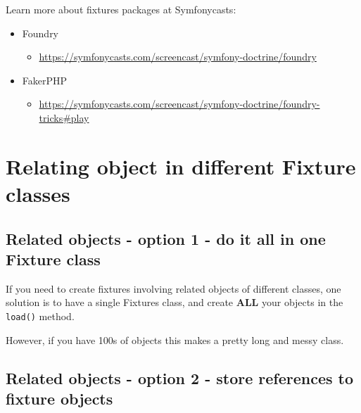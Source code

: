 \documentclass[a4paperpaper,openright]{book}
\providecommand{\tightlist}{%
  \setlength{\itemsep}{0pt}\setlength{\parskip}{0pt}}
\begin{document}
Learn more about fixtures packages at Symfonycasts:

\begin{itemize}
\item
  Foundry

  \begin{itemize}
  \tightlist
  \item
    \url{https://symfonycasts.com/screencast/symfony-doctrine/foundry}
  \end{itemize}
\item
  FakerPHP

  \begin{itemize}
  \tightlist
  \item
    \url{https://symfonycasts.com/screencast/symfony-doctrine/foundry-tricks\#play}
  \end{itemize}
\end{itemize}

\hypertarget{relating-object-in-different-fixture-classes}{%
\chapter{\texorpdfstring{Relating object in different Fixture
classes\label{chapter_related_fixtures}}{Relating object in different Fixture classes}}\label{relating-object-in-different-fixture-classes}}

\hypertarget{related-objects---option-1---do-it-all-in-one-fixture-class}{%
\section{Related objects - option 1 - do it all in one Fixture
class}\label{related-objects---option-1---do-it-all-in-one-fixture-class}}

If you need to create fixtures involving related objects of different
classes, one solution is to have a single Fixtures class, and create
\textbf{ALL} your objects in the \texttt{load()} method.

However, if you have 100s of objects this makes a pretty long and messy
class.

\hypertarget{related-objects---option-2---store-references-to-fixture-objects}{%
\section{Related objects - option 2 - store references to fixture
objects}\label{related-objects---option-2---store-references-to-fixture-objects}}
\end{document}

